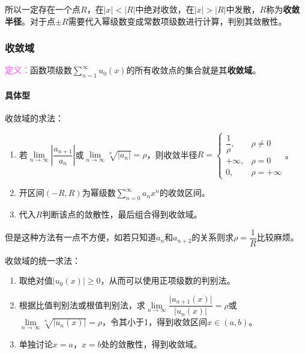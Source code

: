 \documentclass[UTF8, 12pt]{ctexart}
\begin{document}
        所以一定存在一个点$R$，在$\vert x\vert<\vert R\vert$中绝对收敛，在$\vert x\vert>\vert R\vert$中发散，$R$称为\textbf{收敛半径}。对于点$\pm R$需要代入幂级数变成常数项级数进行计算，判别其敛散性。

        \subsubsection{收敛域}

        \textcolor{violet}{\textbf{定义：}}函数项级数$\sum\limits_{n=1}^\infty u_0(x)$的所有收敛点的集合就是其\textbf{收敛域}。

        \paragraph{具体型} \leavevmode \medskip

        收敛域的求法：

        \begin{enumerate}
            \item 若$\lim\limits_{n\to\infty}\left\vert\dfrac{a_{n+1}}{a_n}\right\vert$或$\lim\limits_{n\to\infty}\sqrt[n]{\vert a_n\vert}=\rho$，则收敛半径$R=\left\{\begin{array}{ll}
                                                                                                                                                                         \dfrac{1}{\rho}, & \rho\neq0 \\
                                                                                                                                                                         +\infty, & \rho=0 \\
                                                                                                                                                                         0, & \rho=+\infty
            \end{array}\right.$。
            \item 开区间$(-R,R)$为幂级数$\sum\limits_{n=0}^\infty a_nx^n$的收敛区间。
            \item 代入$R$判断该点的敛散性，最后组合得到收敛域。
        \end{enumerate}

        但是这种方法有一点不方便，如若只知道$a_n$和$a_{n+2}$的关系则求$\rho=\dfrac{1}{R}$比较麻烦。

        收敛域的统一求法：

        \begin{enumerate}
            \item 取绝对值$\vert u_0(x)\vert\geqslant0$，从而可以使用正项级数的判别法。
            \item 根据比值判别法或根值判别法，求$\lim\limits_{n\to\infty}\dfrac{\vert u_{n+1}(x)\vert}{\vert u_n(x)\vert}=\rho$或$\lim\limits_{n\to\infty}\sqrt[n]{\vert u_n(x)\vert}=\rho$，令其小于1，得到收敛区间$x\in(a,b)$。
            \item 单独讨论$x=a$，$x=b$处的敛散性，得到收敛域。
        \end{enumerate}
\end{document}
